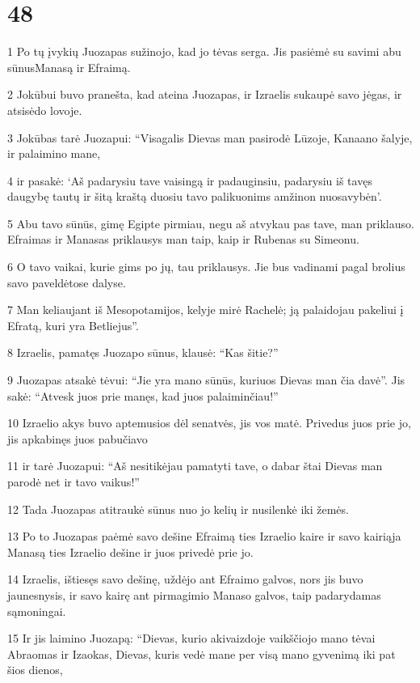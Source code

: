 \chapter{48}

\par 1 Po tų įvykių Juozapas sužinojo, kad jo tėvas serga. Jis pasiėmė su savimi abu sūnus­Manasą ir Efraimą. 
\par 2 Jokūbui buvo pranešta, kad ateina Juozapas, ir Izraelis sukaupė savo jėgas, ir atsisėdo lovoje. 
\par 3 Jokūbas tarė Juozapui: “Visagalis Dievas man pasirodė Lūzoje, Kanaano šalyje, ir palaimino mane, 
\par 4 ir pasakė: ‘Aš padarysiu tave vaisingą ir padauginsiu, padarysiu iš tavęs daugybę tautų ir šitą kraštą duosiu tavo palikuonims amžinon nuosavybėn’. 
\par 5 Abu tavo sūnūs, gimę Egipte pirmiau, negu aš atvykau pas tave, man priklauso. Efraimas ir Manasas priklausys man taip, kaip ir Rubenas su Simeonu. 
\par 6 O tavo vaikai, kurie gims po jų, tau priklausys. Jie bus vadinami pagal brolius savo paveldėtose dalyse. 
\par 7 Man keliaujant iš Mesopotamijos, kelyje mirė Rachelė; ją palaidojau pakeliui į Efratą, kuri yra Betliejus”. 
\par 8 Izraelis, pamatęs Juozapo sūnus, klausė: “Kas šitie?” 
\par 9 Juozapas atsakė tėvui: “Jie yra mano sūnūs, kuriuos Dievas man čia davė”. Jis sakė: “Atvesk juos prie manęs, kad juos palaiminčiau!” 
\par 10 Izraelio akys buvo aptemusios dėl senatvės, jis vos matė. Privedus juos prie jo, jis apkabinęs juos pabučiavo 
\par 11 ir tarė Juozapui: “Aš nesitikėjau pamatyti tave, o dabar štai Dievas man parodė net ir tavo vaikus!” 
\par 12 Tada Juozapas atitraukė sūnus nuo jo kelių ir nusilenkė iki žemės. 
\par 13 Po to Juozapas paėmė savo dešine Efraimą ties Izraelio kaire ir savo kairiąja Manasą ties Izraelio dešine ir juos privedė prie jo. 
\par 14 Izraelis, ištiesęs savo dešinę, uždėjo ant Efraimo galvos, nors jis buvo jaunesnysis, ir savo kairę ant pirmagimio Manaso galvos, taip padarydamas sąmoningai. 
\par 15 Ir jis laimino Juozapą: “Dievas, kurio akivaizdoje vaikščiojo mano tėvai Abraomas ir Izaokas, Dievas, kuris vedė mane per visą mano gyvenimą iki pat šios dienos, 
